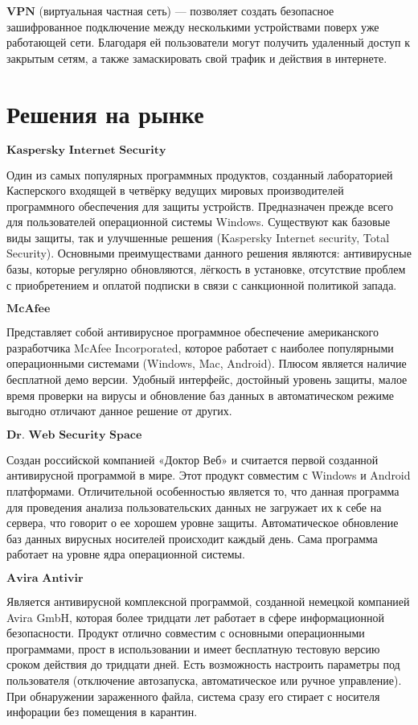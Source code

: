 \documentclass[%
preprint,
amsmath,amssymb,
aps,
]{revtex4-2}
\begin{document}
$\textbf{VPN}$ (виртуальная частная сеть) — позволяет создать безопасное зашифрованное подключение между несколькими устройствами поверх уже работающей сети. Благодаря ей пользователи могут получить удаленный доступ к закрытым сетям, а также замаскировать свой трафик и действия в интернете.




\section{Решения на рынке}
$\textbf{Kaspersky Internet Security}$

Один из самых популярных программных продуктов, созданный лабораторией Касперского входящей в четвёрку ведущих мировых производителей программного обеспечения для защиты устройств. Предназначен прежде всего для пользователей операционной системы Windows. Существуют как базовые виды защиты, так и улучшенные решения (Kaspersky Internet security, Total Security). Основными преимуществами данного решения являются: антивирусные базы, которые регулярно обновляются, лёгкость в установке, отсутствие проблем с приобретением и оплатой подписки в связи с санкционной политикой запада. 

$\textbf{McAfee}$

Представляет собой антивирусное программное обеспечение американского разработчика McAfee Incorporated, которое работает с наиболее популярными операционными системами (Windows, Mac, Android). Плюсом является наличие бесплатной демо версии. Удобный интерфейс, достойный уровень защиты, малое время проверки на вирусы и обновление баз данных в автоматическом режиме выгодно отличают данное решение от других. 

$\textbf{Dr. Web Security Space}$

Создан российской компанией «Доктор Веб» и считается первой созданной антивирусной программой в мире. Этот продукт совместим с Windows и Android платформами. Отличительной особенностью является то, что данная программа для проведения анализа пользовательских данных не загружает их к себе на сервера, что говорит о ее хорошем уровне защиты. Автоматическое обновление баз данных вирусных носителей происходит каждый день. Сама программа работает на уровне ядра операционной системы.

$\textbf{Avira Antivir}$

Является антивирусной комплексной программой, созданной немецкой компанией Avira GmbH, которая более тридцати лет работает в сфере информационной безопасности. Продукт отлично совместим с основными операционными программами, прост в использовании и имеет бесплатную тестовую версию сроком действия до тридцати дней. Есть возможность настроить параметры под пользователя (отключение автозапуска, автоматическое или ручное управление). При обнаружении зараженного файла, система сразу его стирает с носителя инфорации без помещения в карантин.
\end{document}

